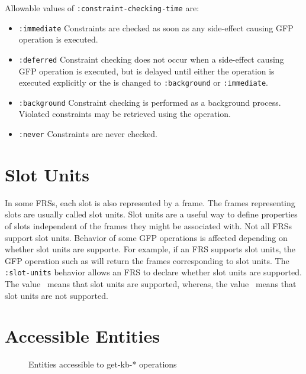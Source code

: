Allowable values of {\tt :constraint-checking-time} are:

\begin{itemize}
\item  {\tt :immediate} Constraints
are checked as soon as any side-effect causing GFP operation is
executed. 

\item {\tt :deferred} Constraint checking does not occur when a
side-effect causing GFP operation is executed, but is delayed until
either the  operation is executed explicitly
or the  is changed to {\tt :background}
or {\tt :immediate}.

\item {\tt :background}  Constraint checking is performed as a
background process.  Violated constraints may be retrieved using the
 operation.

\item {\tt :never} Constraints are never checked.

\end{itemize}

\section{Slot Units}

In some FRSs, each slot is also represented by a frame.  The frames
representing slots are usually called slot units.  Slot units are a
useful way to define properties of slots independent of the frames
they might be associated with.  Not all FRSs support slot units.
Behavior of some GFP operations is affected depending on whether slot
units are supporte.  For example, if an FRS supports slot units, the
GFP operation such as  will return the frames
corresponding to slot units.  The {\tt :slot-units} behavior allows an
FRS to declare whether slot units are supported. The value \true\
means that slot units are supported, whereas, the value \false\ means
that slot units are not supported.

\section{Accessible Entities}

\begin{figure}
\centerline{}
\caption{Entities accessible to get-kb-* operations}
\label{fig:clos}
\end{figure}  

